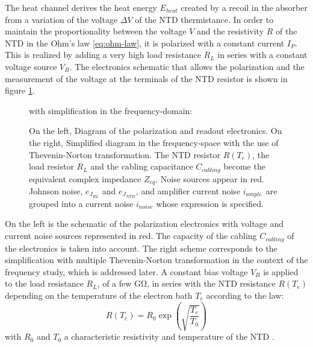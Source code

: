 The heat channel derives the heat energy $E_{heat}$ created by a recoil in the absorber from a variation of the voltage $\Delta V$ of the NTD thermistance.
In order to maintain the proportionality between the voltage $V$ and the resistivity $R$ of the NTD in the Ohm's law \ref{eq:ohm-law}, it is polarized with a constant current $I_P$.
This is realized by adding a very high load resistance $R_L$ in series with a constant voltage source $V_B$.
The electronics schematic that allows the polarization and the measurement of the voltage at the terminals of the NTD resistor is shown in figure \ref{fig:ethem-electric-scheme}.

\begin{figure}
\begin{minipage}[c]{0.45\textwidth}
\resizebox{!}{\textwidth}{%
\begin{circuitikz}[scale=1]
	
\end{circuitikz}
}%
\end{minipage}
\hfill
\vrule{}
\hfill
\begin{minipage}[c]{0.45\textwidth}
\begin{center}
with simplification in the frequency-domain:
\end{center}
\resizebox{\textwidth}{!}{%
\begin{circuitikz}
	
\end{circuitikz}
}%
\end{minipage}
\caption{On the left, Diagram of the polarization and readout electronics. On the right, Simplified diagram in the frequency-space with the use of Thevenin-Norton transformation. The NTD resistor $R(T_e)$, the load resistor $R_L$ and the cabling capacitance $C_{cabling}$ become the equivalent complex impedance $Z_{eq}$. Noise sources appear in red. Johnson noise, $e_{J_{RL}}$ and $e_{J_{NTD}}$, and amplifier current noise $i_{ampli.}$ are grouped into a current noise $i_{noise}$ whose expression is specified.}
\label{fig:ethem-electric-scheme}
\end{figure}

On the left is the schematic of the polarization electronics with voltage and current noise sources represented in red. The capacity of the cabling $C_{cabling}$ of the electronics is taken into account. The right scheme corresponds to the simplification with multiple Thevenin-Norton transformation \cite{Mather:1982} in the context of the frequency study, which is addressed later.
A constant bias voltage $V_B$ is applied to the load resistance $R_L$, of a few \si{\giga\ohm}, in series with the NTD resistance $R(T_e)$ depending on the temperature of the electron bath $T_e$ according to the law:
\begin{equation}
R (T_e) = R_0 \exp \left( \sqrt{ \frac{T_e}{T_0} } \right)
\end{equation}
with $R_0$ and $T_0$ a characteristic resistivity and temperature of the NTD \cite{Mathimalar:2014sfa}.

